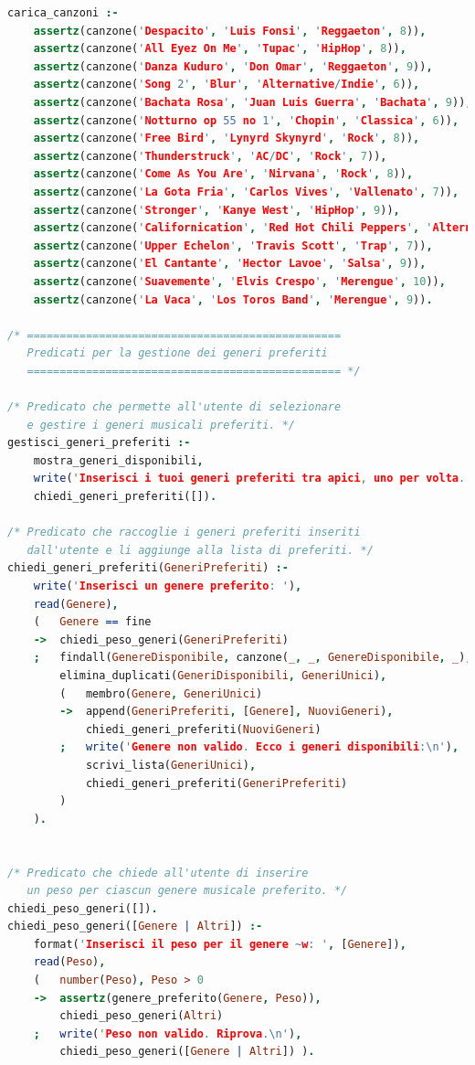 \documentclass[a4paper,11pt]{article}
\begin{document}
\begin{lstlisting}[language=Prolog]
carica_canzoni :- 
    assertz(canzone('Despacito', 'Luis Fonsi', 'Reggaeton', 8)),
    assertz(canzone('All Eyez On Me', 'Tupac', 'HipHop', 8)),
    assertz(canzone('Danza Kuduro', 'Don Omar', 'Reggaeton', 9)),
    assertz(canzone('Song 2', 'Blur', 'Alternative/Indie', 6)),
    assertz(canzone('Bachata Rosa', 'Juan Luis Guerra', 'Bachata', 9)),
    assertz(canzone('Notturno op 55 no 1', 'Chopin', 'Classica', 6)),
    assertz(canzone('Free Bird', 'Lynyrd Skynyrd', 'Rock', 8)),
    assertz(canzone('Thunderstruck', 'AC/DC', 'Rock', 7)),
    assertz(canzone('Come As You Are', 'Nirvana', 'Rock', 8)),
    assertz(canzone('La Gota Fria', 'Carlos Vives', 'Vallenato', 7)),
    assertz(canzone('Stronger', 'Kanye West', 'HipHop', 9)),
    assertz(canzone('Californication', 'Red Hot Chili Peppers', 'Alternative/Indie', 6)),
    assertz(canzone('Upper Echelon', 'Travis Scott', 'Trap', 7)),
    assertz(canzone('El Cantante', 'Hector Lavoe', 'Salsa', 9)),
    assertz(canzone('Suavemente', 'Elvis Crespo', 'Merengue', 10)),
    assertz(canzone('La Vaca', 'Los Toros Band', 'Merengue', 9)).

/* ================================================
   Predicati per la gestione dei generi preferiti
   ================================================ */

/* Predicato che permette all'utente di selezionare 
   e gestire i generi musicali preferiti. */
gestisci_generi_preferiti :- 
    mostra_generi_disponibili,
    write('Inserisci i tuoi generi preferiti tra apici, uno per volta. Scrivi "fine" per terminare.\n'),
    chiedi_generi_preferiti([]).

/* Predicato che raccoglie i generi preferiti inseriti
   dall'utente e li aggiunge alla lista di preferiti. */
chiedi_generi_preferiti(GeneriPreferiti) :- 
    write('Inserisci un genere preferito: '),
    read(Genere),
    (   Genere == fine
    ->  chiedi_peso_generi(GeneriPreferiti)
    ;   findall(GenereDisponibile, canzone(_, _, GenereDisponibile, _), GeneriDisponibili), 
        elimina_duplicati(GeneriDisponibili, GeneriUnici),
        (   membro(Genere, GeneriUnici)
        ->  append(GeneriPreferiti, [Genere], NuoviGeneri),
            chiedi_generi_preferiti(NuoviGeneri)
        ;   write('Genere non valido. Ecco i generi disponibili:\n'),
            scrivi_lista(GeneriUnici),
            chiedi_generi_preferiti(GeneriPreferiti) 
        )
    ).


/* Predicato che chiede all'utente di inserire
   un peso per ciascun genere musicale preferito. */
chiedi_peso_generi([]).
chiedi_peso_generi([Genere | Altri]) :- 
    format('Inserisci il peso per il genere ~w: ', [Genere]),
    read(Peso),
    (   number(Peso), Peso > 0
    ->  assertz(genere_preferito(Genere, Peso)),
        chiedi_peso_generi(Altri)
    ;   write('Peso non valido. Riprova.\n'),
        chiedi_peso_generi([Genere | Altri]) ).


\end{lstlisting}
\end{document}
